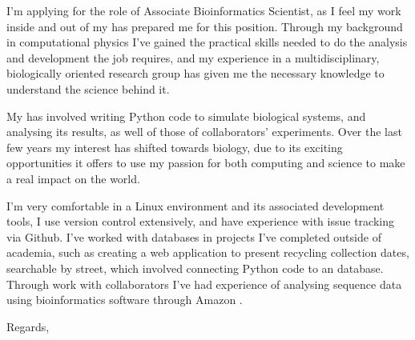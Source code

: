 \documentclass[10pt]{letter}
\begin{document}
    \begin{letter}{}

        I'm applying for the role of Associate Bioinformatics Scientist, as I feel my work inside and out of my  has prepared me for this position. Through my background in computational physics I've gained the practical skills needed to do the analysis and development the job requires, and my experience in a multidisciplinary, biologically oriented research group has given me the necessary knowledge to understand the science behind it.

        My  has involved writing Python code to simulate biological systems, and analysing its results, as well of those of collaborators' experiments. Over the last few years my interest has shifted towards biology, due to its exciting opportunities it offers to use my passion for both computing and science to make a real impact on the world.

        I'm very comfortable in a Linux environment and its associated development tools, I use version control extensively, and have experience with issue tracking via Github. I've worked with databases in projects I've completed outside of academia, such as creating a web application to present recycling collection dates, searchable by street, which involved connecting Python code to an  database. Through work with collaborators I've had experience of analysing sequence data using bioinformatics software through Amazon .

        \closing{Regards,}

    \end{letter}        
\end{document}
